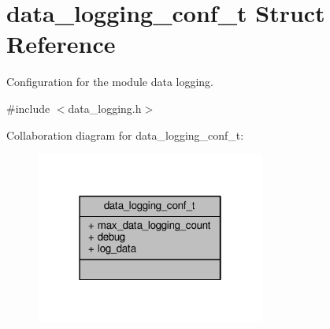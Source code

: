 \hypertarget{structdata__logging__conf__t}{\section{data\+\_\+logging\+\_\+conf\+\_\+t Struct Reference}
\label{structdata__logging__conf__t}
}


Configuration for the module data logging.  




{\ttfamily \#include $<$data\+\_\+logging.\+h$>$}



Collaboration diagram for data\+\_\+logging\+\_\+conf\+\_\+t\+:
\nopagebreak
\begin{figure}[H]
\begin{center}
\leavevmode
\includegraphics[width=214pt]{structdata__logging__conf__t__coll__graph}
\end{center}
\end{figure}
